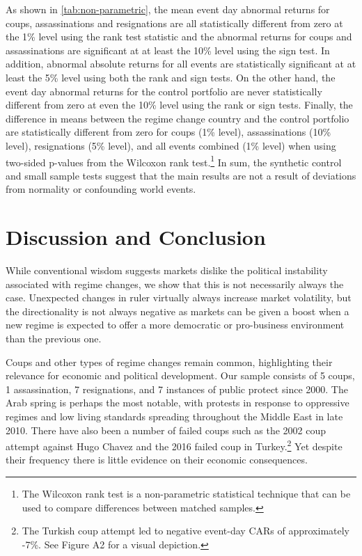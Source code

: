 \documentclass[12pt,final,fleqn]{article}
\theoremstyle{plain}
\begin{document}
As shown in \autoref{tab:non-parametric}, the mean event day abnormal returns for coups, assassinations and resignations are all statistically different from zero at the 1\% level using the rank test statistic and the abnormal returns for coups and assassinations are significant at at least the 10\% level using the sign test. In addition, abnormal absolute returns for all events are statistically significant at at least the 5\% level using both the rank and sign tests. On the other hand, the event day abnormal returns for the control portfolio are never statistically different from zero at even the 10\% level using the rank or sign tests. Finally, the difference in means between the regime change country and the control portfolio are statistically different from zero for coups (1\% level), assassinations (10\% level), resignations (5\% level), and all events combined (1\% level) when using two-sided p-values from the Wilcoxon rank test.\footnote{The Wilcoxon rank test is a non-parametric statistical technique that can be used to compare differences between matched samples.} In sum, the synthetic control and small sample tests suggest that the main results are not a result of deviations from normality or confounding world events.

\section{Discussion and Conclusion}

While conventional wisdom suggests markets dislike the political instability associated with regime changes, we show that this is not necessarily always the case. Unexpected changes in ruler virtually always increase market volatility, but the directionality is not always negative as markets can be given a boost when a new regime is expected to offer a more democratic or pro-business environment than the previous one. 

Coups and other types of regime changes remain common, highlighting their relevance for economic and political development. Our sample consists of 5 coups, 1 assassination, 7 resignations, and 7 instances of public protect since 2000. The Arab spring is perhaps the most notable, with protests in response to oppressive regimes and low living standards spreading throughout the Middle East in late 2010. There have also been a number of failed coups such as the 2002 coup attempt against Hugo Chavez and the 2016 failed coup in Turkey.\footnote{The Turkish coup attempt led to negative event-day CARs of approximately -7\%. See Figure A2 for a visual depiction.} Yet despite their frequency there is little evidence on their economic consequences.
\end{document}
